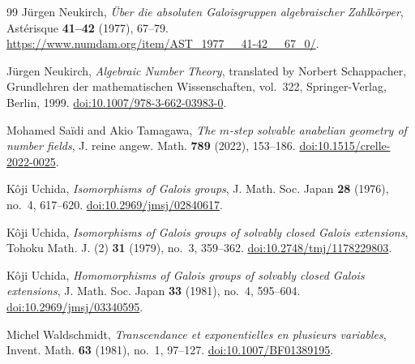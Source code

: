 \begin{thebibliography}{99}
J\"urgen Neukirch,
\emph{\"Uber die absoluten Galoisgruppen algebraischer Zahlk\"orper},
Ast\'erisque \textbf{41--42} (1977), 67--79.
\url{https://www.numdam.org/item/AST_1977__41-42__67_0/}.

J\"urgen Neukirch,
\emph{Algebraic Number Theory},
translated by Norbert Schappacher,
Grundlehren der mathematischen Wissenschaften, vol.~322,
Springer-Verlag, Berlin, 1999.
\href{https://doi.org/10.1007/978-3-662-03983-0}{doi:10.1007/978-3-662-03983-0}.

Mohamed Sa\"idi and Akio Tamagawa,
\emph{The $m$-step solvable anabelian geometry of number fields},
J. reine angew. Math. \textbf{789} (2022), 153--186.
\href{https://doi.org/10.1515/crelle-2022-0025}{doi:10.1515/crelle-2022-0025}.

K\^oji Uchida,
\emph{Isomorphisms of Galois groups},
J. Math. Soc. Japan \textbf{28} (1976), no.~4, 617--620.
\href{https://doi.org/10.2969/jmsj/02840617}{doi:10.2969/jmsj/02840617}.

K\^oji Uchida,
\emph{Isomorphisms of Galois groups of solvably closed Galois extensions},
Tohoku Math. J. (2) \textbf{31} (1979), no.~3, 359--362.
\href{https://doi.org/10.2748/tmj/1178229803}{doi:10.2748/tmj/1178229803}.

K\^oji Uchida,
\emph{Homomorphisms of Galois groups of solvably closed Galois extensions},
J. Math. Soc. Japan \textbf{33} (1981), no.~4, 595--604.
\href{https://doi.org/10.2969/jmsj/03340595}{doi:10.2969/jmsj/03340595}.

Michel Waldschmidt,
\emph{Transcendance et exponentielles en plusieurs variables},
Invent. Math. \textbf{63} (1981), no.~1, 97--127.
\href{https://doi.org/10.1007/BF01389195}{doi:10.1007/BF01389195}.

\end{thebibliography}
